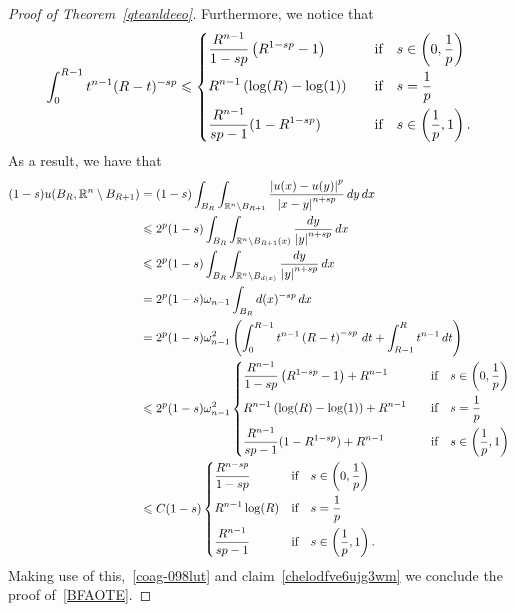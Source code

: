 \documentclass[12pt]{article}
\newcommand{\R}{\mathbb{R}}
\numberwithin{equation}{section}
\renewcommand{\leq}{\leqslant}
\begin{document}
\begin{proof}[Proof of Theorem~\ref{qteanldeeo}]
Furthermore, we notice that 
\begin{equation}\label{fropppitre}
\int_{0}^{R-1}t^{n-1}(R-t)^{-sp}\leq \begin{dcases}
\frac{R^{n-1}}{1-sp} \left(R^{1-sp}-1\right)\quad &\mbox{if}\quad s\in \left(0,\frac{1}{p}\right)\\
R^{n-1} \left(\log(R)-\log(1)\right)\quad &\mbox{if}\quad s=\frac{1}{p}\\
\frac{R^{n-1}}{sp-1}(1-R^{1-sp})\quad &\mbox{if}\quad s\in \left(\frac{1}{p},1\right).
\end{dcases}
\end{equation}
As a result, we have that
\begin{equation*}
\begin{split}
(1-s)u(B_R,\R^{n}\setminus B_{R+1})&=(1-s)\int_{B_{R}}\int_{\R^n\setminus B_{R+1}}\frac{\left|u(x)-u(y)\right|^p}{\left|x-y\right|^{n+sp}}\,dy\,dx\\
&\leq 2^p(1-s)\int_{B_R}\int_{\R^n\setminus B_{R+1}(x)}\frac{dy}{\left|y\right|^{n+sp}}\,dx\\
&\leq 2^{p}(1-s)\int_{B_R}\int_{\R^n\setminus B_{d(x)}}\frac{dy}{\left|y\right|^{n+sp}}\,dx\\  
&=2^{p}(1-s) \omega_{n-1} \int_{B_R} d(x)^{-sp}\,dx\\
&=2^{p}(1-s) \omega_{n-1}^2\left(\int_{0}^{R-1}t^{n-1}\left(R-t\right)^{-sp}\,dt+\int_{R-1}^R t^{n-1}\,dt\right)\\
&\leq 2^{p}(1-s)\omega_{n-1}^{2}\begin{dcases}
\frac{R^{n-1}}{1-sp} \left(R^{1-sp}-1\right)+R^{n-1}\quad &\mbox{if}\quad s\in \left(0,\frac{1}{p}\right)\\
R^{n-1} \left(\log(R)-\log(1)\right)+R^{n-1}\quad &\mbox{if}\quad s=\frac{1}{p}\\
\frac{R^{n-1}}{sp-1}(1-R^{1-sp})+R^{n-1}\quad &\mbox{if}\quad s\in \left(\frac{1}{p},1\right)
\end{dcases}\\
&\leq C(1-s)\begin{dcases}
\frac{R^{n-sp}}{1-sp} &\mbox{if}\quad s\in \left(0,\frac{1}{p}\right)\\
R^{n-1}\log(R)&\mbox{if}\quad s=\frac{1}{p}\\
\frac{R^{n-1}}{sp-1}\quad &\mbox{if}\quad s\in \left(\frac{1}{p},1\right).
\end{dcases}\\
\end{split}
\end{equation*}
Making use of this,~\eqref{coag-098lut} and claim~\eqref{chelodfve6ujg3wm} we conclude the proof of~\eqref{BFAOTE}.


\end{proof}
\end{document}
